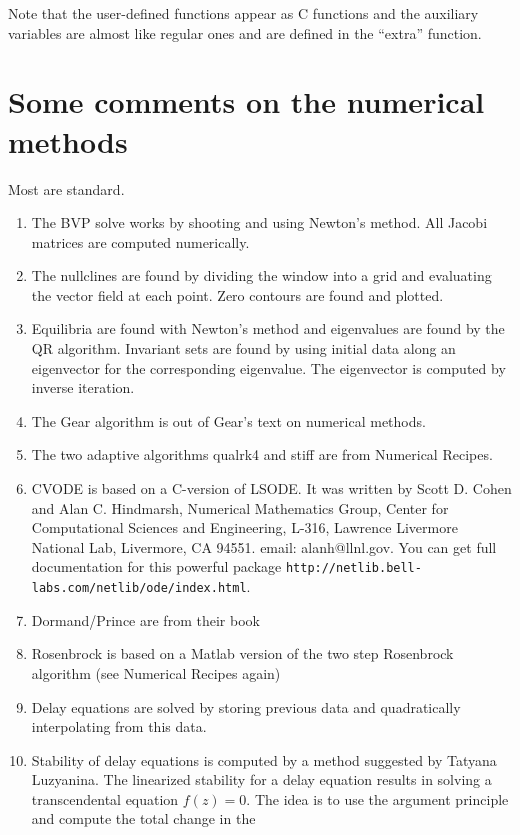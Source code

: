 \documentclass{article}
\begin{document}
Note that the user-defined functions appear as C functions and the
auxiliary variables are almost like regular ones and are defined in
the ``extra'' function.








\section{Some comments on the numerical methods}
Most are standard.   
\begin{enumerate} 
\item The BVP solve works 
by shooting and using Newton's method.  All Jacobi matrices are computed 
numerically.  
\item The nullclines are found by dividing the window into a grid and 
evaluating the vector field at each point.  Zero contours are found
and plotted. 
\item Equilibria are found with Newton's method and eigenvalues are found by the QR
 algorithm.  
Invariant sets are found by using initial data along an eigenvector
 for the corresponding eigenvalue.  The eigenvector is computed by inverse 
iteration. 
\item The Gear algorithm is out of Gear's text 
on numerical methods.
\item The two adaptive algorithms qualrk4 and stiff
 are from Numerical Recipes.
\item CVODE is based on a C-version of LSODE.  It was written by
Scott D. Cohen and Alan C. Hindmarsh, Numerical Mathematics Group,
Center for Computational Sciences and Engineering, L-316,
Lawrence Livermore National Lab, Livermore, CA 94551. email: alanh@llnl.gov.
You can get full documentation for this powerful package 
{\tt http://netlib.bell-labs.com/netlib/ode/index.html}.
\item Dormand/Prince are from their book
\item Rosenbrock is based on a Matlab version of the two step Rosenbrock
algorithm (see Numerical Recipes again)  
\item Delay equations are solved by storing previous data and 
quadratically  interpolating from this data.  
\item Stability of delay equations is computed by a method suggested
by Tatyana Luzyanina. The linearized stability for a delay equation
results in solving a transcendental equation $f(z)=0.$ The idea is to
use the argument principle and compute the total change in the

\end{enumerate}
\end{document}
